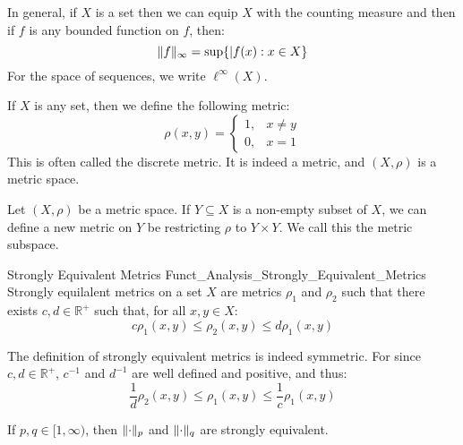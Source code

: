         In general, if $X$ is a set then we can equip $X$
        with the counting measure and then if $f$ is any
        bounded function on $f$, then:
        \begin{equation}
            \lVert f\rVert_{\infty}=\sup\{|f(x):x\in{X}\}
        \end{equation}
        For the space of sequences, we write $\ell^{\infty}(X)$.
        \begin{lexample}
            If $X$ is any set, then we define the following
            metric:
            \begin{equation}
                \rho(x,y)=
                \begin{cases}
                    1,&x\ne{y}\\
                    0,&x=1
                \end{cases}
            \end{equation}
            This is often called the discrete metric. It is
            indeed a metric, and $(X,\rho)$ is a metric space.
        \end{lexample}
        \begin{lexample}
            Let $(X,\rho)$ be a metric space. If $Y\subseteq{X}$
            is a non-empty subset of $X$, we can define a new
            metric on $Y$
            be restricting $\rho$ to $Y\times{Y}$. We call
            this the metric subspace.
        \end{lexample}
        \begin{ldefinition}{Strongly Equivalent Metrics}
              {Funct_Analysis_Strongly_Equivalent_Metrics}
            Strongly equilalent metrics on a set $X$ are metrics
            $\rho_{1}$ and $\rho_{2}$ such that there
            exists $c,d\in\mathbb{R}^{+}$ such that, for
            all $x,y\in{X}$:
            \begin{equation}
                c\rho_{1}(x,y)\leq
                    \rho_{2}(x,y)\leq{d}\rho_{1}(x,y)
            \end{equation}
        \end{ldefinition}
        The definition of strongly equivalent metrics is indeed
        symmetric. For since $c,d\in\mathbb{R}^{+}$,
        $c^{-1}$ and $d^{-1}$ are well defined and positive,
        and thus:
        \begin{equation}
            \frac{1}{d}\rho_{2}(x,y)\leq\rho_{1}(x,y)
            \leq\frac{1}{c}\rho_{1}(x,y)
        \end{equation}
        \begin{theorem}
            If $p,q\in[1,\infty)$, then $\lVert\cdot\rVert_{p}$ and
            $\lVert\cdot\rVert_{q}$ are strongly equivalent.
        \end{theorem}
